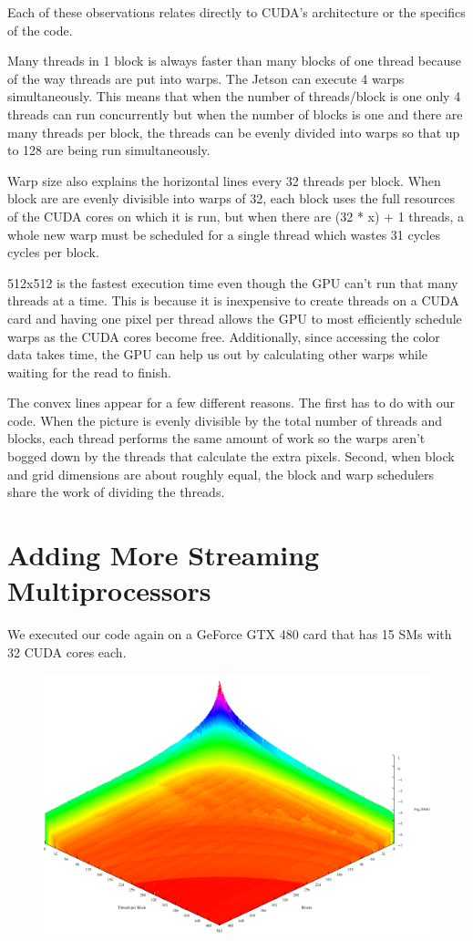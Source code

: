 \documentclass[letterpaper,10pt,openany,oneside]{sphinxmanual}
\begin{document}
Each of these observations relates directly to CUDA's
architecture or the specifics of the code.

Many threads in 1 block is always faster than many blocks of
one thread because of the way threads are put into warps.
The Jetson can execute 4 warps simultaneously. This means that
when the number of threads/block is one only 4 threads can run concurrently
but when the number of blocks is one and there are many threads per block,
the threads can be evenly divided
into warps so that up to 128 are being run simultaneously.

Warp size also explains the horizontal lines every
32 threads per block. When block are are evenly divisible
into warps of 32, each block uses the full resources of the
CUDA cores on which it is run, but when there are (32 * x) +
1 threads, a whole new warp must be scheduled for a single
thread which wastes 31 cycles cycles per block.

512x512 is the fastest execution time even though the GPU
can't run that many threads at a time. This is because
it is inexpensive to create threads on a CUDA card and having
one pixel per thread allows the GPU to
most efficiently schedule warps as the CUDA cores become free.
Additionally, since accessing the color data takes time, the
GPU can help us out by calculating other warps while waiting
for the read to finish.

The convex lines appear for a few different reasons. The
first has to do with our code. When the picture is evenly
divisible by the total number of threads and blocks, each
thread performs the same amount of work so the warps aren't
bogged down by the threads that calculate the extra pixels.
Second, when block and grid dimensions are about roughly
equal, the block and warp schedulers share the work of
dividing the threads.


\section{Adding More Streaming Multiprocessors}
\label{2-Findings/Findings:adding-more-streaming-multiprocessors}
We executed our code again on a GeForce GTX 480 card that
has 15 SMs with 32 CUDA cores each.
\begin{figure}[htbp]
\centering

\includegraphics{Dev0Medium.png}
\end{figure}
\end{document}
